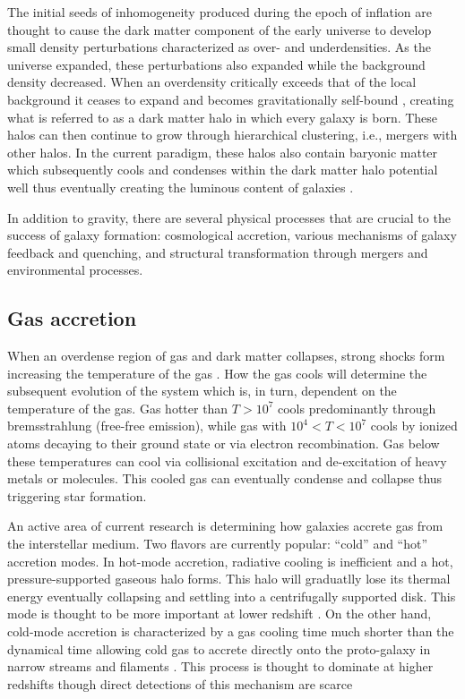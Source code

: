 The initial seeds of inhomogeneity produced during the epoch of inflation are thought to cause the dark matter component of the early universe to develop small density perturbations characterized as over- and underdensities. As the universe expanded, these perturbations also expanded while the background density decreased. When an overdensity critically exceeds that of the local background it ceases to expand and becomes gravitationally self-bound \citep{Gunn1972}, creating what is referred to as a dark matter halo in which every galaxy is born. These halos can then continue to grow through hierarchical clustering, i.e., mergers with other halos. In the current paradigm, these halos also contain baryonic matter which subsequently cools and condenses within the dark matter halo potential well thus eventually creating the luminous content of galaxies \citep{White1978}. 

In addition to gravity, there are several physical processes that are crucial to the success of galaxy formation: cosmological accretion, various mechanisms of galaxy feedback and quenching, and structural transformation through mergers and environmental processes. 


\subsection{Gas accretion}

When an overdense region of gas and dark matter collapses, strong shocks form increasing the temperature of the gas \citep{Binney1977,Rees1977}. How the gas cools will determine the subsequent evolution of the system which is, in turn, dependent on the temperature of the gas.  Gas hotter than $T>10^7$ cools predominantly through bremsstrahlung (free-free emission), while gas with $10^4<T<10^7$ cools by ionized atoms decaying to their ground state or via electron recombination. Gas below these temperatures can cool via collisional excitation and de-excitation of heavy metals or molecules. This cooled gas can eventually condense and collapse thus triggering star formation. 

An active area of current research is determining how galaxies accrete gas from the interstellar medium. Two flavors are currently popular: ``cold'' and ``hot'' accretion modes. In hot-mode accretion, radiative cooling is inefficient and a hot, pressure-supported gaseous halo forms. This halo will graduatlly lose its thermal energy eventually collapsing and settling into a centrifugally supported disk.  This mode is thought to be more important at lower redshift \cite{Faucher-Giguere2011,VandeVoort2011}. On the other hand, cold-mode accretion is characterized by a gas cooling time much shorter than the dynamical time allowing cold gas to accrete directly onto the proto-galaxy in narrow streams and filaments \citep{WhiteFrenk1991, Birnboim2003,Keres2005,Dekel2009b}. This process is thought to dominate at higher redshifts \citep{Katz2003} though direct detections of this mechanism are scarce \citep{Steidel2010,Beck2016,Fumagalli2016,Martin2015,Martin2016}


